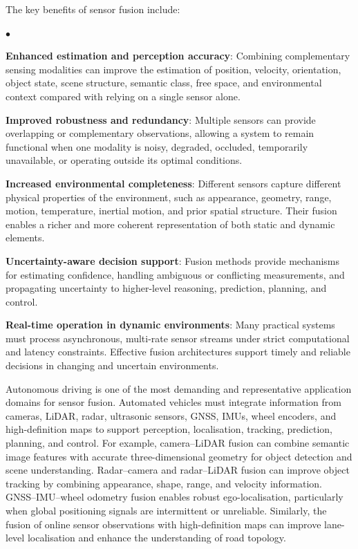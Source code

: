 \documentclass[11pt,oneside,openany]{book}
\newenvironment{list4a}{
  \begin{list}{$\bullet$}{%
      \setlength{\itemsep}{0.05cm}
      \setlength{\labelsep}{0.2cm}
      \setlength{\labelwidth}{0.3cm}
      \setlength{\parsep}{0in}
      \setlength{\parskip}{0in}
      \setlength{\topsep}{0in}
      \setlength{\partopsep}{0in}
      \setlength{\leftmargin}{0.16in}}}
      {\end{list}}
\begin{document}
The key benefits of sensor fusion include:
\begin{list4a}
    \item \textbf{Enhanced estimation and perception accuracy}: Combining complementary sensing modalities can improve the estimation of position, velocity, orientation, object state, scene structure, semantic class, free space, and environmental context compared with relying on a single sensor alone.
    \item \textbf{Improved robustness and redundancy}: Multiple sensors can provide overlapping or complementary observations, allowing a system to remain functional when one modality is noisy, degraded, occluded, temporarily unavailable, or operating outside its optimal conditions.
    \item \textbf{Increased environmental completeness}: Different sensors capture different physical properties of the environment, such as appearance, geometry, range, motion, temperature, inertial motion, and prior spatial structure. Their fusion enables a richer and more coherent representation of both static and dynamic elements.
    \item \textbf{Uncertainty-aware decision support}: Fusion methods provide mechanisms for estimating confidence, handling ambiguous or conflicting measurements, and propagating uncertainty to higher-level reasoning, prediction, planning, and control.
    \item \textbf{Real-time operation in dynamic environments}: Many practical systems must process asynchronous, multi-rate sensor streams under strict computational and latency constraints. Effective fusion architectures support timely and reliable decisions in changing and uncertain environments.
\end{list4a}

Autonomous driving is one of the most demanding and representative application domains for sensor fusion. Automated vehicles must integrate information from cameras, LiDAR, radar, ultrasonic sensors, GNSS, IMUs, wheel encoders, and high-definition maps to support perception, localisation, tracking, prediction, planning, and control. For example, camera--LiDAR fusion can combine semantic image features with accurate three-dimensional geometry for object detection and scene understanding. Radar--camera and radar--LiDAR fusion can improve object tracking by combining appearance, shape, range, and velocity information. GNSS--IMU--wheel odometry fusion enables robust ego-localisation, particularly when global positioning signals are intermittent or unreliable. Similarly, the fusion of online sensor observations with high-definition maps can improve lane-level localisation and enhance the understanding of road topology.
\end{document}

